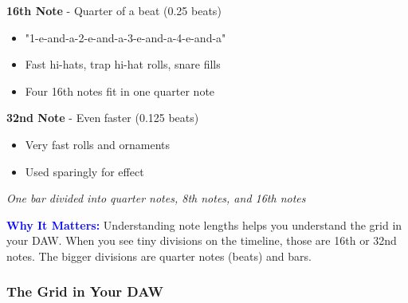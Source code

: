 \documentclass[11pt,letterpaper]{article}
\newcommand{\bluepurple}[1]{\textcolor{blue}{\textbf{#1}}}
\begin{document}
\textbf{16th Note} - Quarter of a beat (0.25 beats)
\begin{itemize}[leftmargin=*]
\item "1-e-and-a-2-e-and-a-3-e-and-a-4-e-and-a"
\item Fast hi-hats, trap hi-hat rolls, snare fills
\item Four 16th notes fit in one quarter note
\end{itemize}

\textbf{32nd Note} - Even faster (0.125 beats)
\begin{itemize}[leftmargin=*]
\item Very fast rolls and ornaments
\item Used sparingly for effect
\end{itemize}

\begin{center}

\textit{One bar divided into quarter notes, 8th notes, and 16th notes}
\end{center}

\textbf{\bluepurple{Why It Matters:}} Understanding note lengths helps you understand the grid in your DAW. When you see tiny divisions on the timeline, those are 16th or 32nd notes. The bigger divisions are quarter notes (beats) and bars.

\subsubsection{The Grid in Your DAW}
\end{document}
